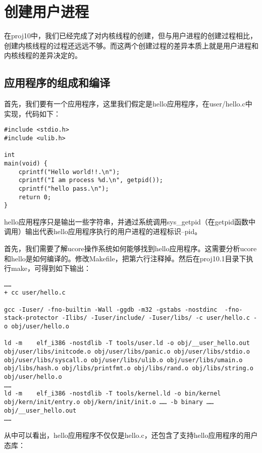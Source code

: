 \section{创建用户进程}\label{ux521bux5efaux7528ux6237ux8fdbux7a0b}

在proj10中，我们已经完成了对内核线程的创建，但与用户进程的创建过程相比，创建内核线程的过程还远远不够。而这两个创建过程的差异本质上就是用户进程和内核线程的差异决定的。

\subsection{应用程序的组成和编译}\label{ux5e94ux7528ux7a0bux5e8fux7684ux7ec4ux6210ux548cux7f16ux8bd1}

首先，我们要有一个应用程序，这里我们假定是hello应用程序，在user/hello.c中实现，代码如下：

\begin{lstlisting}
#include <stdio.h>
#include <ulib.h>

int
main(void) {
    cprintf("Hello world!!.\n");
    cprintf("I am process %d.\n", getpid());
    cprintf("hello pass.\n");
    return 0;
}
\end{lstlisting}

hello应用程序只是输出一些字符串，并通过系统调用sys\_getpid（在getpid函数中调用）输出代表hello应用程序执行的用户进程的进程标识--pid。

首先，我们需要了解ucore操作系统如何能够找到hello应用程序。这需要分析ucore和hello是如何编译的。修改Makefile，把第六行注释掉。然后在proj10.1目录下执行make，可得到如下输出：

\begin{lstlisting}
……
+ cc user/hello.c

gcc -Iuser/ -fno-builtin -Wall -ggdb -m32 -gstabs -nostdinc  -fno-stack-protector -Ilibs/ -Iuser/include/ -Iuser/libs/ -c user/hello.c -o obj/user/hello.o

ld -m    elf_i386 -nostdlib -T tools/user.ld -o obj/__user_hello.out  obj/user/libs/initcode.o obj/user/libs/panic.o obj/user/libs/stdio.o obj/user/libs/syscall.o obj/user/libs/ulib.o obj/user/libs/umain.o  obj/libs/hash.o obj/libs/printfmt.o obj/libs/rand.o obj/libs/string.o obj/user/hello.o
……
ld -m    elf_i386 -nostdlib -T tools/kernel.ld -o bin/kernel  obj/kern/init/entry.o obj/kern/init/init.o …… -b binary …… obj/__user_hello.out
……
\end{lstlisting}

从中可以看出，hello应用程序不仅仅是hello.c，还包含了支持hello应用程序的用户态库：

